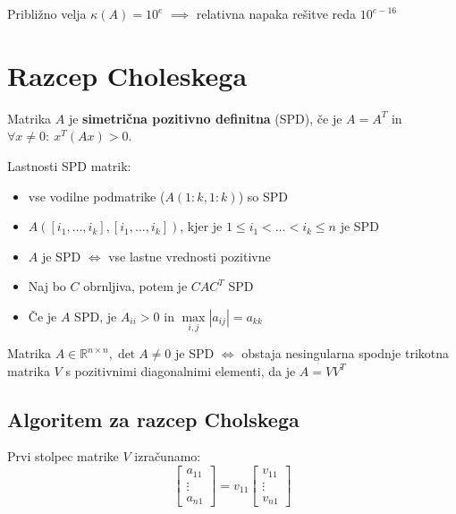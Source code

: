 \begin{multicols}{4}
Približno velja $\kappa(A) = 10^e$ $\implies$ relativna napaka rešitve reda $10^{e-16}$

\section{Razcep Choleskega}
Matrika $A$ je \textbf{simetrična pozitivno definitna} (SPD), če je $A = A^T$ in $\forall x \neq 0:\ x^T(Ax) > 0$.

Lastnosti SPD matrik:
\begin{itemize}
	\item vse vodilne podmatrike ($A(1:k, 1:k)$) so SPD
	\item $A([i_1, \dots, i_k], [i_1, \dots, i_k])$, kjer je $1 \leq i_1 < \dots < i_k \leq n$ je SPD
	\item $A$ je SPD $\iff$ vse lastne vrednosti pozitivne
	\item Naj bo $C$ obrnljiva, potem je $CAC^T$ SPD
	\item Če je $A$ SPD, je $A_{ii} > 0$ in $\max\limits_{i,j} |a_{ij}| = a_{kk}$
\end{itemize}

Matrika $A \in \mathbb{R}^{n\times n}, \det A \neq 0$ je SPD $\iff$ obstaja nesingularna spodnje trikotna matrika $V$ s pozitivnimi diagonalnimi elementi, da je $A = VV^T$

\subsection{Algoritem za razcep Cholskega}
Prvi stolpec matrike $V$ izračunamo:
\[
\begin{bmatrix}
	a_{11} \\ \vdots \\ a_{n1}
\end{bmatrix}
=
v_{11} \begin{bmatrix}
	v_{11} \\ \vdots \\ v_{n1}
\end{bmatrix}
\]


\end{multicols}
